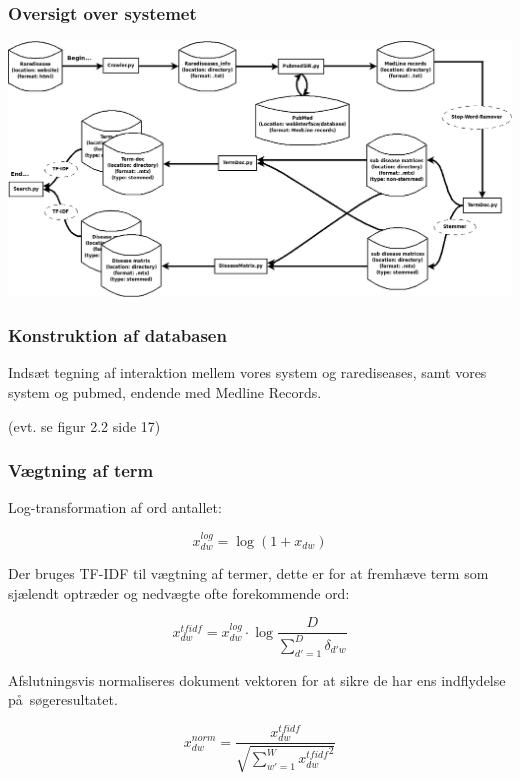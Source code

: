 \documentclass[xcolor=table]{beamer}
\begin{document}
\begin{frame}

  \frametitle{Oversigt over systemet}

  \begin{center}
    \includegraphics[width=1.0\textwidth]{diagram/system_overview}
  \end{center}

\end{frame}

\begin{frame}

  \frametitle{Konstruktion af databasen}

  Inds\ae t tegning af interaktion mellem vores system og rarediseases, samt vores system og pubmed, endende med Medline Records.

  (evt. se figur 2.2 side 17)

\end{frame}

\begin{frame}

  \frametitle{V\ae gtning af term}

  Log-transformation af ord antallet:

  \[
  x_{dw}^{log} = \log{(1 + x_{dw})}
  \]

  Der bruges TF-IDF til v\ae gtning af termer, dette er for at fremh\ae ve term som sj\ae lendt optr\ae der og nedv\ae gte ofte forekommende ord:

  \[
  x_{dw}^{tfidf} = x_{dw}^{log} \cdot \log{\frac{D}{\sum_{d\prime = 1}^{D}\delta_{d\prime w}}}
  \]

  Afslutningsvis normaliseres dokument vektoren for at sikre de har ens indflydelse p\aa\ s\o geresultatet.

  \[
  x_{dw}^{norm} = \frac{x_{dw}^{tfidf}}{\sqrt{\sum_{w\prime = 1}^{W} {x_{dw}^{tfidf}}^{2}}}
  \]

\end{frame}
\end{document}
